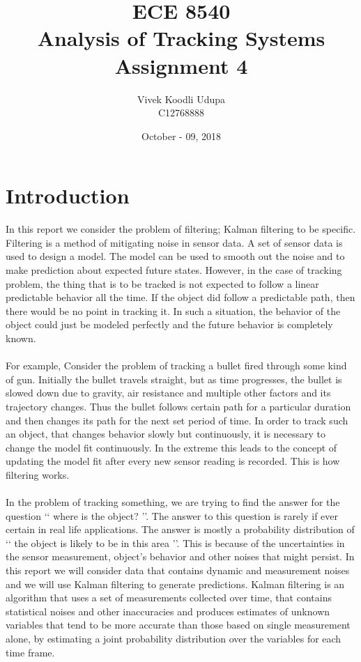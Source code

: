 \documentclass[12pt]{article}
\title{ECE 8540 \\ Analysis of Tracking Systems \\ 
	Assignment 4}
\author{Vivek Koodli Udupa \\ C12768888}
\date{October - 09, 2018 }
\begin{document}
\begin{titlepage}
\maketitle
{}%
\end{titlepage}



\section{Introduction}
In this report we consider the problem of filtering; Kalman filtering to be specific. Filtering is a method of mitigating noise in sensor data. A set of sensor data is used to design a model. The model can be used to smooth out the noise and to make prediction about expected future states. However, in the case of tracking problem, the thing that is to be tracked is not expected to follow a linear predictable behavior all the time. If the object did follow a predictable path, then there would be no point in tracking it. In such a situation, the behavior of the object could just be modeled perfectly and the future behavior is completely known.  \\
\\
For example, Consider the problem of tracking a bullet fired through some kind of gun. Initially the bullet travels straight, but as time progresses, the bullet is slowed down due to gravity, air resistance and multiple other factors and its trajectory changes. Thus the bullet follows certain path for a particular duration and then changes its path for the next set period of time. In order to track such an object, that changes behavior slowly but continuously, it is necessary to change the model fit continuously. In the extreme this leads to the concept of updating the model fit after every new sensor reading is recorded. This is how filtering works. \\
\\
In the problem of tracking something, we are trying to find the answer for the question \lq\lq{} where is the object? \rq\rq{}. The answer to this question is rarely if ever certain in real life applications. The answer is mostly a probability distribution of \lq\lq{} the object is likely to be in this area \rq\rq{}. This is because of the uncertainties in the sensor measurement, object's behavior and other noises that might persist. In this report we will consider data that contains dynamic and measurement noises and we will use Kalman filtering to generate predictions. Kalman filtering is an algorithm that uses a set of measurements collected over time, that contains statistical noises and other inaccuracies and produces estimates of unknown variables that tend to be more accurate than those based on single measurement alone, by estimating a joint probability distribution over the variables for each time frame.\\
\end{document}
